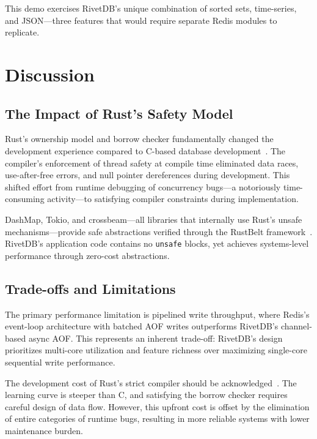 \documentclass[conference,a4paper]{IEEEtran}
\begin{document}
This demo exercises RivetDB's unique combination of sorted sets, time-series, and JSON---three features that would require separate Redis modules to replicate.

\section{Discussion}

\subsection{The Impact of Rust's Safety Model}

Rust's ownership model and borrow checker fundamentally changed the development experience compared to C-based database development~\cite{jung2021}. The compiler's enforcement of thread safety at compile time eliminated data races, use-after-free errors, and null pointer dereferences during development. This shifted effort from runtime debugging of concurrency bugs---a notoriously time-consuming activity---to satisfying compiler constraints during implementation.

DashMap, Tokio, and crossbeam---all libraries that internally use Rust's unsafe mechanisms---provide safe abstractions verified through the RustBelt framework~\cite{jung2021}. RivetDB's application code contains no \texttt{unsafe} blocks, yet achieves systems-level performance through zero-cost abstractions.

\subsection{Trade-offs and Limitations}

The primary performance limitation is pipelined write throughput, where Redis's event-loop architecture with batched AOF writes outperforms RivetDB's channel-based async AOF. This represents an inherent trade-off: RivetDB's design prioritizes multi-core utilization and feature richness over maximizing single-core sequential write performance.

The development cost of Rust's strict compiler should be acknowledged~\cite{jung2021}. The learning curve is steeper than C, and satisfying the borrow checker requires careful design of data flow. However, this upfront cost is offset by the elimination of entire categories of runtime bugs, resulting in more reliable systems with lower maintenance burden.
\end{document}
